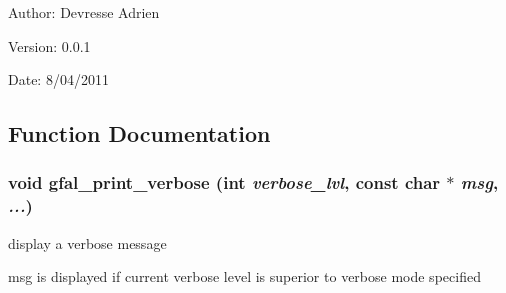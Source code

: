 \begin{Desc}
\item[Author:]Devresse Adrien \end{Desc}
\begin{Desc}
\item[Version:]0.0.1 \end{Desc}
\begin{Desc}
\item[Date:]8/04/2011 \end{Desc}


\subsection{Function Documentation}
\subsubsection{\setlength{\rightskip}{0pt plus 5cm}void gfal\_\-print\_\-verbose (int {\em verbose\_\-lvl}, const char $\ast$ {\em msg},  {\em ...})}\label{gfal__common__errverbose_8h_8b05640b4b43a776603bd93703c29d30}


display a verbose message 

msg is displayed if current verbose level is superior to verbose mode specified 